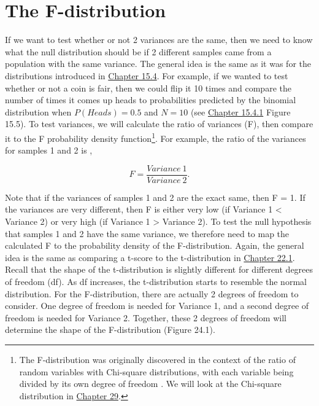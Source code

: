\documentclass[
  openany]{krantz}
\begin{document}
\hypertarget{the-f-distribution}{%
\section{The F-distribution}\label{the-f-distribution}}

If we want to test whether or not 2 variances are the same, then we need to know what the null distribution should be if 2 different samples came from a population with the same variance.
The general idea is the same as it was for the distributions introduced in \protect\hyperlink{probability-distributions}{Chapter 15.4}.
For example, if we wanted to test whether or not a coin is fair, then we could flip it 10 times and compare the number of times it comes up heads to probabilities predicted by the binomial distribution when \(P(Heads) = 0.5\) and \(N = 10\) (see \protect\hyperlink{binomial-distribution}{Chapter 15.4.1} Figure 15.5).
To test variances, we will calculate the ratio of variances (F), then compare it to the F probability density function\footnote{The F-distribution was originally discovered in the context of the ratio of random variables with Chi-square distributions, with each variable being divided by its own degree of freedom \citep{Miller2004}. We will look at the Chi-square distribution in \protect\hyperlink{Chapter_29}{Chapter 29}.}.
For example, the ratio of the variances for samples 1 and 2 is \citep{Sokal1995},

\[F = \frac{Variance\:1}{Variance\:2}.\]

Note that if the variances of samples 1 and 2 are the exact same, then F = 1.
If the variances are very different, then F is either very low (if Variance 1 \textless{} Variance 2) or very high (if Variance 1 \textgreater{} Variance 2).
To test the null hypothesis that samples 1 and 2 have the same variance, we therefore need to map the calculated F to the probability density of the F-distribution.
Again, the general idea is the same as comparing a t-score to the t-distribution in \protect\hyperlink{one-sample-t-test}{Chapter 22.1}.
Recall that the shape of the t-distribution is slightly different for different degrees of freedom (df).
As df increases, the t-distribution starts to resemble the normal distribution.
For the F-distribution, there are actually 2 degrees of freedom to consider.
One degree of freedom is needed for Variance 1, and a second degree of freedom is needed for Variance 2.
Together, these 2 degrees of freedom will determine the shape of the F-distribution (Figure 24.1).
\end{document}
